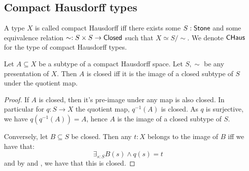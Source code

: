 \subsection{Compact Hausdorff types}
\begin{definition}
  A type $X$ is called compact Hausdorff iff there exists some $S:\mathsf{Stone}$ and some 
  equivalence relation $\sim:S \times S \to \mathsf{Closed}$ such that $X \simeq S / \sim$. 
  We denote $\mathsf{CHaus}$ for the type of compact Hausdorff types. 
\end{definition} 

\begin{lemma}\label{CompactHausdorffClosed}
Let $A\subseteq X$ be a subtype of a compact Hausdorff space. 
Let $S, \sim$ be any presentation of $X$. 
Then $A$ is closed iff it is the image of a closed subtype of $S$ under the quotient map. 
\end{lemma}
\begin{proof}
  If $A$ is closed, then it's pre-image under any map is also closed. 
  In particular for $q:S\to X$ the quotient map, $q^{-1}(A)$ is closed. 
  As $q$ is surjective, we have $q(q^{-1}(A)) = A$,
  hence $A$ is the image of a closed subtype of $S$. 
  
  Conversely, let $B\subseteq S$ be closed. 
  Then any $t:X$ belongs to the image of $B$ iff we have that:
  $$ \exists_{s:S} B(s)\land q(s) = t$$
 and by  and , 
  we have that this is closed. 
  \end{proof}

